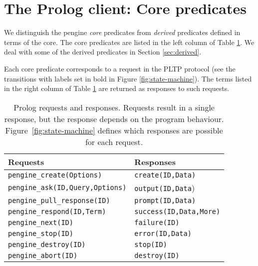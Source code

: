 \documentclass{new_tlp}
\newcommand{\Figref}[1]{Figure~\ref{fig:#1}}
\begin{document}
\section{The Prolog client: Core predicates}

We distinguish the pengine \textit{core} predicates from
\textit{derived} predicates defined in terms of the core. The core
predicates are listed in the left column of Table \ref{pl-table}. We
deal with some of the derived predicates in Section \ref{sec:derived}.

Each core predicate corresponds to a
request in the PLTP protocol (see the transitions with labels
set in bold in Figure \ref{fig:state-machine}). The terms listed in the
right column of Table \ref{pl-table} are returned as responses to such
requests.

\begin{table}[h]
  \caption{Prolog requests and responses.  Requests result in a single
	   response, but the response depends on the program behaviour.
	   \Figref{state-machine} defines which responses are possible
	   for each request.}
  \label{pl-table}
  \begin{minipage}{\textwidth}
    \begin{tabular}{ll}
      \hline\hline
      Requests& Responses\\
      \hline
      \texttt{pengine\_create(Options)}	      &	\texttt{create(ID,Data)}       \\
      \texttt{pengine\_ask(ID,Query,Options)} &	\texttt{output(ID,Data})       \\
      \texttt{pengine\_pull\_response(ID)}    &	\texttt{prompt(ID,Data)}       \\
      \texttt{pengine\_respond(ID,Term)}      &	\texttt{success(ID,Data,More)} \\
      \texttt{pengine\_next(ID)}	      &	\texttt{failure(ID)}	       \\
      \texttt{pengine\_stop(ID)}	      &	\texttt{error(ID,Data)}	       \\
      \texttt{pengine\_destroy(ID)}	      &	\texttt{stop(ID)}	       \\
      \texttt{pengine\_abort(ID)}	      &	\texttt{destroy(ID)}	       \\
      \hline\hline
    \end{tabular}
    \vspace{-2\baselineskip}
  \end{minipage}
\end{table}
\end{document}
